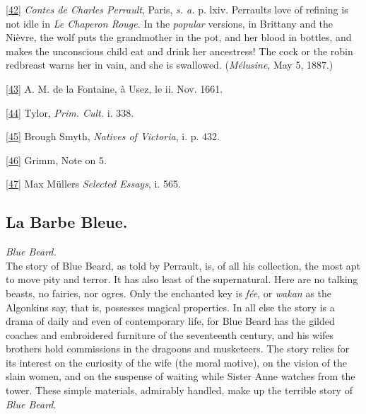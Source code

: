 \documentclass[14pt,a4paper]{memoir}
\begin{document}
\protect\hypertarget{4533318093929944247_33931-h-0.htm.xhtmlux5cux23Footnote_42}{}{}\protect\hyperlink{4533318093929944247_33931-h-0.htm.xhtmlux5cux23FNanchor_42}{{{[}42{]}}}
\emph{Contes de Charles Perrault}, Paris, \emph{s. a.} p. lxiv.
Perrault\textquotesingle s love of refining is not idle in \emph{Le
Chaperon Rouge}. In the \emph{popular} versions, in Brittany and the
Nièvre, the wolf puts the grandmother in the pot, and her blood in
bottles, and makes the unconscious child eat and drink her ancestress!
The cock or the robin redbreast warns her in vain, and she is swallowed.
(\emph{Mélusine}, May 5, 1887.)

\protect\hypertarget{4533318093929944247_33931-h-0.htm.xhtmlux5cux23Footnote_43}{}{}\protect\hyperlink{4533318093929944247_33931-h-0.htm.xhtmlux5cux23FNanchor_43}{{{[}43{]}}}
A. M. de la Fontaine, à Usez, le ii. Nov. 1661.

\protect\hypertarget{4533318093929944247_33931-h-0.htm.xhtmlux5cux23Footnote_44}{}{}\protect\hyperlink{4533318093929944247_33931-h-0.htm.xhtmlux5cux23FNanchor_44}{{{[}44{]}}}
Tylor, \emph{Prim. Cult.} i. 338.

\protect\hypertarget{4533318093929944247_33931-h-0.htm.xhtmlux5cux23Footnote_45}{}{}\protect\hyperlink{4533318093929944247_33931-h-0.htm.xhtmlux5cux23FNanchor_45}{{{[}45{]}}}
Brough Smyth, \emph{Natives of Victoria}, i. p. 432.

\protect\hypertarget{4533318093929944247_33931-h-0.htm.xhtmlux5cux23Footnote_46}{}{}\protect\hyperlink{4533318093929944247_33931-h-0.htm.xhtmlux5cux23FNanchor_46}{{{[}46{]}}}
Grimm, Note on 5.

\protect\hypertarget{4533318093929944247_33931-h-0.htm.xhtmlux5cux23Footnote_47}{}{}\protect\hyperlink{4533318093929944247_33931-h-0.htm.xhtmlux5cux23FNanchor_47}{{{[}47{]}}}
Max Müller\textquotesingle s \emph{Selected Essays}, i. 565.

\subsection{La Barbe Bleue.}

\emph{Blue Beard.} \\

The story of Blue Beard, as told by Perrault, is, of all his collection,
the most apt to move pity and terror. It has also least of the
supernatural. Here are no talking beasts, no fairies, nor ogres. Only
the enchanted key is \emph{fée}, or \emph{wakan} as the Algonkins say,
that is, possesses magical properties. In all else the story is a drama
of daily and even of contemporary life, for Blue Beard has the gilded
coaches and embroidered furniture of the seventeenth century, and his
wife\textquotesingle s brothers hold commissions in the dragoons and
musketeers. The story relies for its interest on the curiosity of the
wife (the moral motive), on the vision of the slain women, and on the
suspense of waiting while Sister Anne watches from the tower. These
simple materials, admirably handled, make up the terrible story of
\emph{Blue Beard}.
\end{document}
